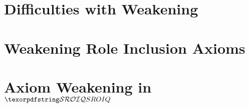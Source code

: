 

\section{Difficulties with Weakening \SROIQ} \label{expressivity-problems}



\section{Weakening Role Inclusion Axioms} \label{rbox-weakening}



\section{Axiom Weakening in \texorpdfstring{$\SROIQ$}{SROIQ}} \label{weakening-sroiq}


